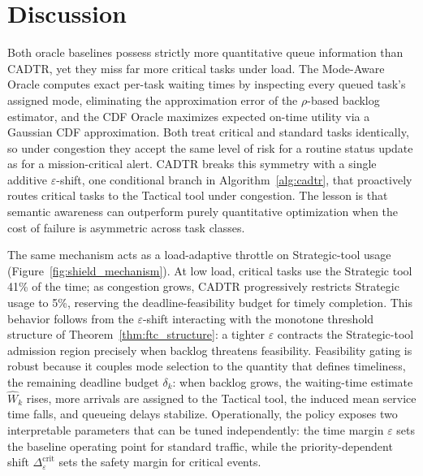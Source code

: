 \documentclass[fleqn,12pt,lineno]{wlpeerj}
\begin{document}
\clearpage
\section{Discussion}
\label{sec:discussion}

Both oracle baselines possess strictly more quantitative queue information than CADTR, yet they miss far more critical tasks under load. The Mode-Aware Oracle computes exact per-task waiting times by inspecting every queued task's assigned mode, eliminating the approximation error of the $\rho$-based backlog estimator, and the CDF Oracle maximizes expected on-time utility via a Gaussian CDF approximation. Both treat critical and standard tasks identically, so under congestion they accept the same level of risk for a routine status update as for a mission-critical alert. CADTR breaks this symmetry with a single additive $\varepsilon$-shift, one conditional branch in Algorithm~\ref{alg:cadtr}, that proactively routes critical tasks to the Tactical tool under congestion. The lesson is that semantic awareness can outperform purely quantitative optimization when the cost of failure is asymmetric across task classes.

The same mechanism acts as a load-adaptive throttle on Strategic-tool usage (Figure~\ref{fig:shield_mechanism}). At low load, critical tasks use the Strategic tool 41\% of the time; as congestion grows, CADTR progressively restricts Strategic usage to 5\%, reserving the deadline-feasibility budget for timely completion. This behavior follows from the $\varepsilon$-shift interacting with the monotone threshold structure of Theorem~\ref{thm:ftc_structure}: a tighter $\varepsilon$ contracts the Strategic-tool admission region precisely when backlog threatens feasibility. Feasibility gating is robust because it couples mode selection to the quantity that defines timeliness, the remaining deadline budget $\delta_k$: when backlog grows, the waiting-time estimate $\widehat{W}_k$ rises, more arrivals are assigned to the Tactical tool, the induced mean service time falls, and queueing delays stabilize. Operationally, the policy exposes two interpretable parameters that can be tuned independently: the time margin $\varepsilon$ sets the baseline operating point for standard traffic, while the priority-dependent shift $\Delta_{\varepsilon}^{\mathrm{crit}}$ sets the safety margin for critical events.
\end{document}
